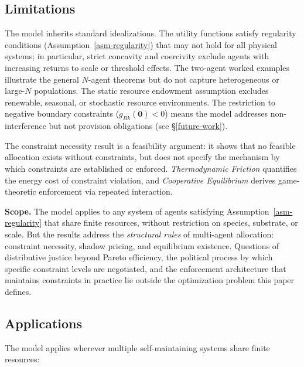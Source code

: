\documentclass[11pt]{article}
\theoremstyle{plain}
\theoremstyle{definition}
\theoremstyle{remark}
\let\origsubsection\subsection
\renewcommand{\subsection}{\needspace{7\baselineskip}\origsubsection}
\begin{document}
\subsection{Limitations}\label{limitations}

The model inherits standard idealizations. The utility functions satisfy
regularity conditions (Assumption~\ref{asm-regularity}) that may not
hold for all physical systems; in particular, strict concavity and
coercivity exclude agents with increasing returns to scale or threshold
effects. The two-agent worked examples illustrate the general
\(N\)-agent theorems but do not capture heterogeneous or large-\(N\)
populations. The static resource endowment assumption excludes
renewable, seasonal, or stochastic resource environments. The
restriction to negative boundary constraints
(\(g_{Bk}(\mathbf{0}) < 0\)) means the model addresses non-interference
but not provision obligations (see §\ref{future-work}).

The constraint necessity result is a feasibility argument: it shows that
no feasible allocation exists without constraints, but does not specify
the mechanism by which constraints are established or enforced.
\emph{Thermodynamic Friction} \citep{TC-IV} quantifies the energy cost
of constraint violation, and \emph{Cooperative Equilibrium} \citep{TC-V}
derives game-theoretic enforcement via repeated interaction.

\textbf{Scope.} The model applies to any system of agents satisfying
Assumption~\ref{asm-regularity} that share finite resources, without
restriction on species, substrate, or scale. But the results address the
\emph{structural rules} of multi-agent allocation: constraint necessity,
shadow pricing, and equilibrium existence. Questions of distributive
justice beyond Pareto efficiency, the political process by which
specific constraint levels are negotiated, and the enforcement
architecture that maintains constraints in practice lie outside the
optimization problem this paper defines.

\subsection{Applications}\label{applications}

The model applies wherever multiple self-maintaining systems share
finite resources:
\end{document}
